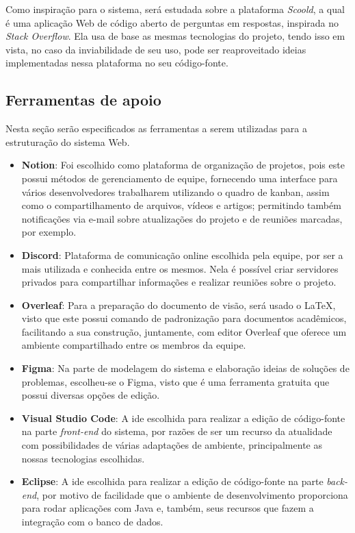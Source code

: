 Como inspiração para o sistema, será estudada sobre a plataforma \textit{Scoold}, a qual é uma aplicação  Web de código aberto de perguntas em respostas, inspirada no \textit{Stack Overflow}. Ela usa de base as mesmas tecnologias do projeto, tendo isso em vista, no caso da inviabilidade de seu uso, pode ser reaproveitado ideias implementadas nessa plataforma no seu código-fonte.

\subsection{Ferramentas de apoio}

Nesta seção serão especificados as ferramentas a serem utilizadas para a estruturação do sistema  Web.

\begin{itemize}
\item \textbf{Notion}: Foi escolhido como plataforma de organização de projetos, pois este possui métodos de gerenciamento de equipe, fornecendo uma interface para vários desenvolvedores trabalharem utilizando o quadro de kanban, assim como o compartilhamento de arquivos, vídeos e artigos; permitindo também notificações via e-mail sobre atualizações do projeto e de reuniões marcadas, por exemplo. 
    
\item \textbf{Discord}: Plataforma de comunicação online escolhida pela equipe, por ser a mais utilizada e conhecida entre os mesmos. Nela é possível criar servidores privados para compartilhar informações e realizar reuniões sobre o projeto.
    
\item \textbf{Overleaf}: Para a preparação do documento de visão, será usado o \LaTeX, visto que este possui comando de padronização para documentos acadêmicos, facilitando a sua construção, juntamente, com editor Overleaf que oferece um ambiente compartilhado entre os membros da equipe. 
    
\item \textbf{Figma}: Na parte de modelagem do sistema e elaboração ideias de soluções de problemas, escolheu-se o Figma, visto que é uma ferramenta gratuita que possui diversas opções de edição.
    
\item \textbf{Visual Studio Code}: A \acs{ide} escolhida para realizar a edição de código-fonte na parte \textsl{\gls{front-end}} do sistema, por razões de ser um recurso da atualidade com possibilidades de várias adaptações de ambiente, principalmente as nossas tecnologias escolhidas.

\item \textbf{Eclipse}: A \acs{ide} escolhida para realizar a edição de código-fonte na parte \textsl{\gls{back-end}}, por motivo de facilidade que o ambiente de desenvolvimento proporciona para rodar aplicações com Java e, também, seus recursos que fazem a integração com o banco de dados.
\end{itemize}





